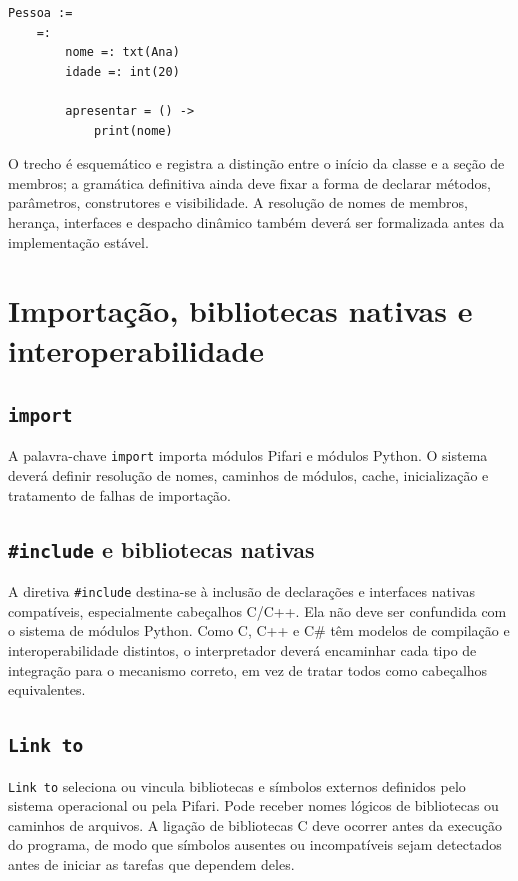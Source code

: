 \documentclass[12pt,a4paper]{article}
\begin{document}
\begin{lstlisting}
Pessoa :=
    =:
        nome =: txt(Ana)
        idade =: int(20)

        apresentar = () ->
            print(nome)
\end{lstlisting}

O trecho é esquemático e registra a distinção entre o início da classe e a seção de membros; a gramática definitiva ainda deve fixar a forma de declarar métodos, parâmetros, construtores e visibilidade. A resolução de nomes de membros, herança, interfaces e despacho dinâmico também deverá ser formalizada antes da implementação estável.

\section{Importação, bibliotecas nativas e interoperabilidade}
\subsection{\texttt{import}}
A palavra-chave \texttt{import} importa módulos Pifari e módulos Python. O sistema deverá definir resolução de nomes, caminhos de módulos, cache, inicialização e tratamento de falhas de importação.

\subsection{\texttt{\#include} e bibliotecas nativas}
A diretiva \texttt{\#include} destina-se à inclusão de declarações e interfaces nativas compatíveis, especialmente cabeçalhos C/C++. Ela não deve ser confundida com o sistema de módulos Python. Como C, C++ e C\# têm modelos de compilação e interoperabilidade distintos, o interpretador deverá encaminhar cada tipo de integração para o mecanismo correto, em vez de tratar todos como cabeçalhos equivalentes.

\subsection{\texttt{Link to}}
\texttt{Link to} seleciona ou vincula bibliotecas e símbolos externos definidos pelo sistema operacional ou pela Pifari. Pode receber nomes lógicos de bibliotecas ou caminhos de arquivos. A ligação de bibliotecas C deve ocorrer antes da execução do programa, de modo que símbolos ausentes ou incompatíveis sejam detectados antes de iniciar as tarefas que dependem deles.
\end{document}
